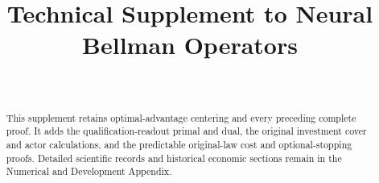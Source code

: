 \documentclass[ecta,nameyear,draft]{econsocart}
\begin{document}
\begin{frontmatter}
\title{Technical Supplement to Neural Bellman Operators}
\begin{aug}
\author[id=au1,addressref={add1}]{~}
\address[id=add1]{Peking University}
\end{aug}
\begin{abstract}
This supplement retains optimal-advantage centering and every preceding complete proof. It adds the qualification-readout primal and dual, the original investment cover and actor calculations, and the predictable original-law cost and optional-stopping proofs. Detailed scientific records and historical economic sections remain in the Numerical and Development Appendix.
\end{abstract}
\end{frontmatter}








\end{document}
